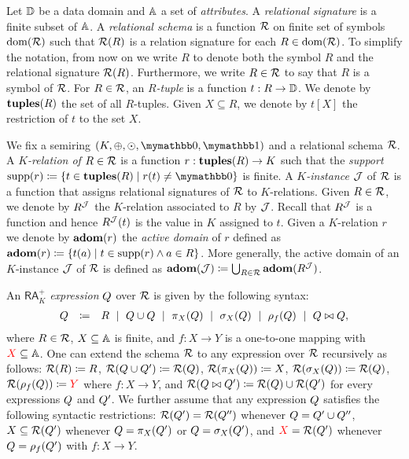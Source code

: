 Let $\mathbb{D}$ be a data domain and $\mathbb{A}$ a set of \textit{attributes}. A \textit{relational signature} is a finite subset of $\mathbb{A}$. A \textit{relational schema} is a function $\mathcal{R}$ on finite set of symbols $\operatorname{dom}(\mathcal{R})$ such that $\mathcal{R}(R)$ is a relation signature for each $R \in \operatorname{dom}(\mathcal{R})$. To simplify the notation, from now on we write $R$ to denote both the symbol $R$ and the relational signature $\mathcal{R}(R)$.
Furthermore, we write $R \in \mathcal{R}$ to say that $R$ is a symbol of $\mathcal{R}$. 
For $R \in \mathcal{R}$, an \textit{$R$-tuple} is a function $t: R \rightarrow \mathbb{D}$. We denote by $\mathbf{tuples}(R)$ the set of all $R$-tuples. Given $X \subseteq R$, we denote by $t[X]$ the restriction of $t$ to the set $X$.

We fix a semiring $(K, \ksum, \kprod, \kzero, \kone)$ and a relational schema $\mathcal{R}$. A \textit{$K$-relation of} $R \in \mathcal{R}$ is a function $r: \mathbf{tuples}(R) \rightarrow K$ such that the \textit{support}  $\supp(r)\coloneqq  \{t \in \tuples(R) \mid r(t) \neq \kzero\}$ is finite. 
A \textit{$K$-instance} $\mathcal{J}$ of $\mathcal{R}$ is a function that assigns relational signatures of $\mathcal{R}$ to $K$-relations. Given $R \in \mathcal{R}$, we denote by $R^{\mathcal{J}}$ the $K$-relation associated to $R$ by $\mathcal{J}$. Recall that $R^{\mathcal{J}}$ is a function and hence  $R^{\mathcal{J}}(t)$ is the value in $K$ assigned to $t$. 
Given a $K$-relation $r$ we denote by $\mathbf{adom}(r)$ the \textit{active domain} of $r$ defined as $\mathbf{adom}(r)\coloneqq  \{t(a) \mid t \in \operatorname{supp}(r) \wedge a \in R\}$. More generally, the active domain of an $K$-instance $\mathcal{J}$ of $\mathcal{R}$ is defined as $\mathbf{adom}(\mathcal{J})\coloneqq  \bigcup_{R \in \mathcal{R}} \mathbf{adom}(R^{\mathcal{J}})$. 

An $\mathsf{RA}_{K}^+$  \textit{expression} $Q$ over $\mathcal{R}$ is given by the following syntax:
$$
\begin{array}{rcl}
Q & \coloneqq  & R \ \mid \ Q \cup Q \ \mid \  \pi_X(Q) \ \mid \  \sigma_X(Q) \ \mid \ \rho_f(Q) \ \mid \ Q \bowtie Q,
\end{array}
$$
where $R \in \mathcal{R}$, $X \subseteq \mathbb{A}$ is finite, and $f: X \rightarrow Y$ is a one-to-one mapping with ${\color{red} X} \subseteq \mathbb{A}$. One can extend the schema $\mathcal{R}$ to any expression over $\mathcal{R}$ recursively as follows: $\mathcal{R}(R)\coloneqq  R$, $\mathcal{R}(Q \cup Q')\coloneqq  \mathcal{R}(Q)$, $\mathcal{R}(\pi_X(Q))\coloneqq  X$, $\mathcal{R}(\sigma_X(Q))\coloneqq  \mathcal{R}(Q)$, $\mathcal{R}(\rho_f(Q))\coloneqq {\color{red} Y}$ where $f:X \rightarrow Y$, and $\mathcal{R}(Q \bowtie Q')\coloneqq  \mathcal{R}(Q) \cup \mathcal{R}(Q')$ for every expressions $Q$ and $Q'$.
We further assume that any expression $Q$ satisfies the following syntactic restrictions: $\mathcal{R}(Q') = \mathcal{R}(Q'')$ whenever $Q = Q' \cup Q''$, $X \subseteq \mathcal{R}(Q')$ whenever $Q = \pi_X(Q')$ or $Q = \sigma_X(Q')$, and ${\color{red} X} = \mathcal{R}(Q')$ whenever $Q = \rho_f(Q')$ with $f: X \rightarrow Y$.

